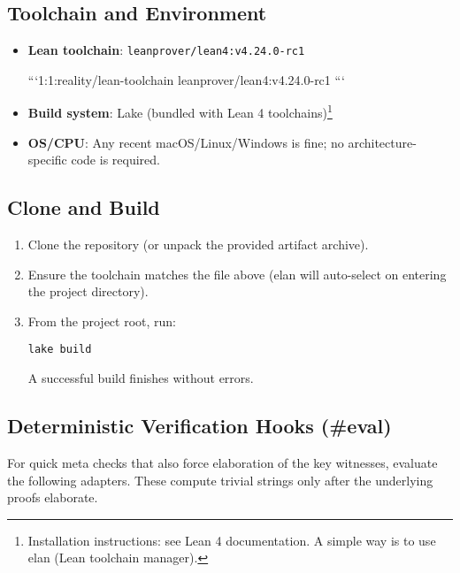 \documentclass{article}
\begin{document}
\subsection{Toolchain and Environment}
\begin{itemize}[leftmargin=*]
  \item \textbf{Lean toolchain}: \texttt{leanprover/lean4:v4.24.0-rc1}

```1:1:reality/lean-toolchain
leanprover/lean4:v4.24.0-rc1
```

  \item \textbf{Build system}: Lake (bundled with Lean 4 toolchains)\footnote{Installation instructions: see Lean 4 documentation. A simple way is to use elan (Lean toolchain manager).}
  \item \textbf{OS/CPU}: Any recent macOS/Linux/Windows is fine; no architecture-specific code is required.
\end{itemize}

\subsection{Clone and Build}
\begin{enumerate}[leftmargin=*]
  \item Clone the repository (or unpack the provided artifact archive).
  \item Ensure the toolchain matches the file above (elan will auto-select on entering the project directory).
  \item From the project root, run:

\begin{lstlisting}
lake build
\end{lstlisting}

  A successful build finishes without errors.
\end{enumerate}

\subsection{Deterministic Verification Hooks (\#eval)}
For quick meta checks that also force elaboration of the key witnesses, evaluate the following adapters. These compute trivial strings only after the underlying proofs elaborate.
\end{document}
